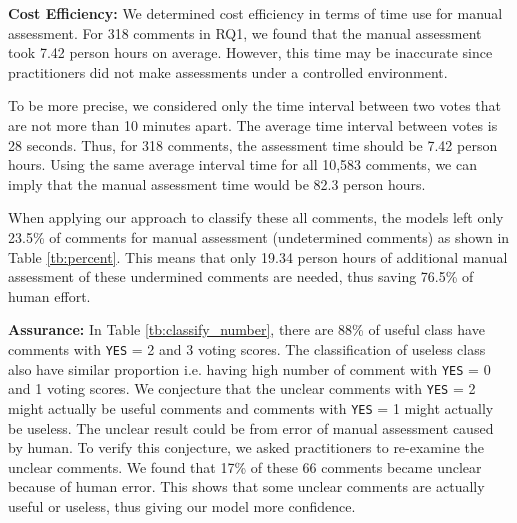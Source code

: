 \textbf{Cost Efficiency:}
We determined cost efficiency in terms of time use for manual assessment.
For 318 comments in RQ1, we found that the manual assessment took 7.42 person hours on average.
However, this time may be inaccurate since practitioners did not make assessments under a controlled environment.

To be more precise, we considered only the time interval between two votes that are not more than 10 minutes apart.
The average time interval between votes is 28 seconds.
Thus, for 318 comments, the assessment time should be 7.42 person hours.
Using the same average interval time for all 10,583 comments,
we can imply that the manual assessment time would be 82.3 person hours.

When applying our approach to classify these all comments, the models left only 23.5\% of comments for manual assessment (undetermined comments) as shown in Table \ref{tb:percent}.
This means that only 19.34 person hours of additional manual assessment of these undermined comments are needed, thus saving 76.5\% of human effort.

%
%
%

\textbf{Assurance:} In Table \ref{tb:classify_number}, there are 88\% of useful class have comments with \texttt{YES} = 2 and 3 voting scores. The classification of useless class also have similar proportion i.e. having high number of comment with \texttt{YES} = 0 and 1 voting scores. We conjecture that the unclear comments with \texttt{YES} = 2 might actually be useful comments and comments with \texttt{YES} = 1 might actually be useless. The unclear result could be from error of manual assessment caused by human.
To verify this conjecture, we asked practitioners to re-examine the unclear comments.
We found that 17\% of these 66 comments became unclear because of human error.
This shows that some unclear comments are actually useful or useless, thus giving our model more confidence.

